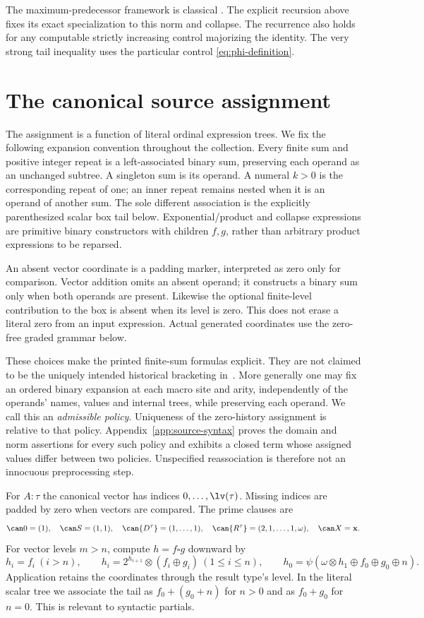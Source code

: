 The maximum-predecessor framework is classical \cite{bcw}.  The explicit
recursion above fixes its exact specialization to this norm and collapse.
The recurrence also holds for any computable strictly increasing control
majorizing the identity.  The very strong tail inequality uses the particular
control \eqref{eq:phi-definition}.

\section{The canonical source assignment}\label{sec:assignment}

The assignment is a function of literal ordinal expression trees. We fix
the following expansion convention throughout the collection. Every finite
sum and positive integer repeat is a left-associated binary sum, preserving
each operand as an unchanged subtree. A singleton sum is its operand. A
numeral $k>0$ is the corresponding repeat of one; an inner repeat remains
nested when it is an operand of another sum. The sole different association
is the explicitly parenthesized scalar box tail below. Exponential/product
and collapse expressions are primitive binary constructors with children
$f,g$, rather than arbitrary product expressions to be reparsed.

An absent vector coordinate is a padding marker, interpreted as zero only
for comparison. Vector addition omits an absent operand; it constructs a
binary sum only when both operands are present. Likewise the optional
finite-level contribution to the box is absent when its level is zero.
This does not erase a literal zero from an input expression. Actual
generated coordinates use the zero-free graded grammar below.

These choices make the printed finite-sum formulas explicit. They are not
claimed to be the uniquely intended historical bracketing in~\cite{ww}.
More generally one may fix an ordered binary expansion at each macro site
and arity, independently of the operands' names, values and internal trees,
while preserving each operand. We call this an \emph{admissible policy}.
Uniqueness of the zero-history assignment is relative to that policy.
Appendix~\ref{app:source-syntax} proves the domain and norm assertions for
every such policy and exhibits a closed term whose assigned values differ
between two policies. Unspecified reassociation is therefore not an
innocuous preprocessing step.

For $A:\tau$ the canonical vector has indices $0,\ldots,\lv(\tau)$.
Missing indices are padded by zero when vectors are compared.  The prime
clauses are
\[
 \can0=(1),\quad \can S=(1,1),\quad
 \can{D^\tau}=(1,\ldots,1),\quad
 \can{R^\tau}=(2,1,\ldots,1,\omega),\quad \can X=\mathbf x.
\]
For vector levels $m>n$, compute $h=f\square g$ downward by
\[
 h_i=f_i\ (i>n),\qquad
 h_i=2^{h_{i+1}}\otimes(f_i\oplus g_i)\ (1\le i\le n),\qquad
 h_0=\psi(\omega\otimes h_1\oplus f_0\oplus g_0\oplus n).
\]
Application retains the coordinates through the result type's level.
In the literal scalar tree we associate the tail as $f_0+(g_0+n)$ for
$n>0$ and as $f_0+g_0$ for $n=0$.  This is relevant to syntactic partials.

